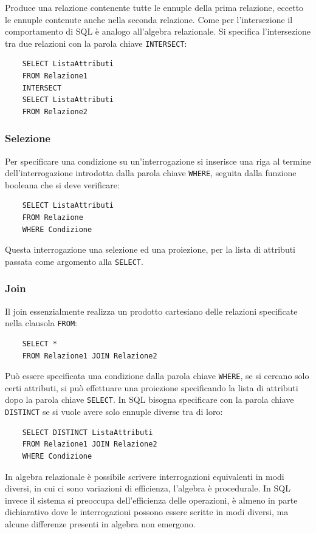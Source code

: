 \documentclass{article}
\numberwithin{equation}{subsection}
\begin{document}
Produce una relazione contenente tutte le ennuple della prima relazione, eccetto le ennuple contenute anche nella seconda relazione. Come per l'intersezione il comportamento di SQL è analogo all'algebra relazionale. 
Si specifica l'intersezione tra due relazioni con la parola chiave \verb|INTERSECT|:
\begin{verbatim}
    SELECT ListaAttributi
    FROM Relazione1
    INTERSECT
    SELECT ListaAttributi
    FROM Relazione2
\end{verbatim}

\subsubsection{Selezione}

Per specificare una condizione su un'interrogazione si inserisce una riga al termine dell'interrogazione introdotta dalla parola chiave \verb|WHERE|, seguita dalla funzione booleana che si deve verificare:

\begin{verbatim}
    SELECT ListaAttributi
    FROM Relazione
    WHERE Condizione
\end{verbatim}

Questa interrogazione una selezione ed una proiezione, per la lista di attributi passata come argomento alla \verb|SELECT|. 

\subsubsection{Join}

Il join essenzialmente realizza un prodotto cartesiano delle relazioni specificate nella clausola \verb|FROM|: 
\begin{verbatim}
    SELECT *
    FROM Relazione1 JOIN Relazione2
\end{verbatim}

Può essere specificata una condizione dalla parola chiave \verb|WHERE|, se si cercano solo certi attributi, si può effettuare una proiezione specificando la lista di attributi dopo 
la parola chiave \verb|SELECT|. In SQL bisogna specificare con la parola chiave \verb|DISTINCT| se si vuole avere solo ennuple diverse tra di loro: 
\begin{verbatim}
    SELECT DISTINCT ListaAttributi
    FROM Relazione1 JOIN Relazione2
    WHERE Condizione
\end{verbatim}


In algebra relazionale è possibile scrivere interrogazioni equivalenti in modi diversi, in cui ci sono variazioni di efficienza, 
l'algebra è procedurale. In SQL invece il sistema si preoccupa dell'efficienza delle operazioni, è almeno in parte dichiarativo dove le interrogazioni 
possono essere scritte in modi diversi, ma alcune differenze presenti in algebra non emergono. 
\end{document}
